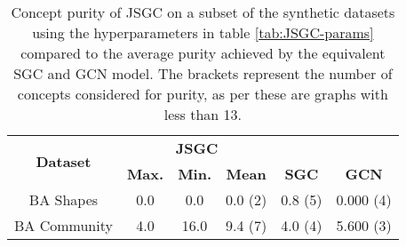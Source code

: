 \begin{table}
    \centering
    \begin{tabular}{c|ccc|cc}
        \multirow{2}{*}{\textbf{Dataset}} &
        \multicolumn{3}{c|}{\textbf{JSGC}} & \\
        & \textbf{Max.} & \textbf{Min.} & \textbf{Mean} & 
        \multirow{-2}{*}{\textbf{SGC}} &
        \multirow{-2}{*}{\textbf{GCN}}\\
        \midrule
        BA Shapes       & 0.0 & 0.0 & 0.0 (2) & 0.8 (5) & 0.000 (4) \\
        BA Community    & 4.0 & 16.0 & 9.4 (7) & 4.0 (4) & 5.600 (3) \\
    \end{tabular}
    \caption{Concept purity of JSGC on a subset of the synthetic datasets using the hyperparameters in table \ref{tab:JSGC-params} compared to the average purity achieved by the equivalent SGC and GCN model. The brackets represent the number of concepts considered for purity, as per  these are graphs with less than 13.}
    \label{tab:JSGC-purity}
\end{table}

